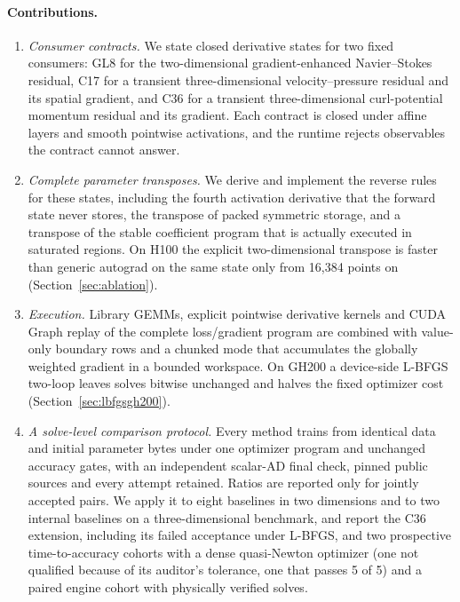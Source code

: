 \documentclass[11pt]{article}
\begin{document}
\paragraph{Contributions.}
\begin{enumerate}
\item \emph{Consumer contracts.} We state closed derivative states for two
fixed consumers: GL8 for the two-dimensional gradient-enhanced
Navier--Stokes residual, C17 for a transient three-dimensional
velocity--pressure residual and its spatial gradient, and C36 for a
transient three-dimensional curl-potential momentum residual and its
gradient. Each contract is closed
under affine layers and smooth pointwise activations, and the runtime
rejects observables the contract cannot answer.
\item \emph{Complete parameter transposes.} We derive and implement the
reverse rules for these states, including the fourth activation derivative
that the forward state never stores, the transpose of packed symmetric
storage, and a transpose of the stable coefficient program that is actually
executed in saturated regions. On H100 the explicit two-dimensional
transpose is faster than generic autograd on the same state only from
16,384 points on (Section~\ref{sec:ablation}).
\item \emph{Execution.} Library GEMMs, explicit pointwise derivative kernels
and CUDA Graph replay of the complete loss/gradient program are combined
with value-only boundary rows and a chunked mode that accumulates the
globally weighted gradient in a bounded workspace. On GH200 a device-side
L-BFGS two-loop leaves solves bitwise unchanged and halves the fixed
optimizer cost (Section~\ref{sec:lbfgsgh200}).
\item \emph{A solve-level comparison protocol.} Every method trains from
identical data and initial parameter bytes under one optimizer program and
unchanged accuracy gates, with an independent scalar-AD final check, pinned
public sources and every attempt retained. Ratios are reported only for
jointly accepted pairs. We apply it to eight baselines in two dimensions
and to two internal baselines on a three-dimensional benchmark, and report
the C36 extension, including its failed acceptance under L-BFGS, and two
prospective time-to-accuracy cohorts with a dense quasi-Newton optimizer
(one not qualified because of its auditor's tolerance, one that passes 5
of 5) and a paired engine cohort with physically verified solves.
\end{enumerate}
\end{document}
